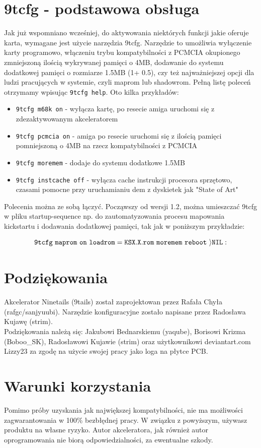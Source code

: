 \documentclass[10pt,a5paper]{article}
\begin{document}
\section *{9tcfg - podstawowa obsługa}

Jak już wspomniano wcześniej, do aktywowania niektórych funkcji jakie oferuje karta, wymagane jest użycie narzędzia 9tcfg. Narzędzie to umożliwia wyłączenie karty programowo, włączeniu trybu kompatybilności z PCMCIA okupionego zmniejszoną ilością wykrywanej pamięci o 4MB, dodawanie do systemu dodatkowej pamięci o rozmiarze 1.5MB (1+ 0.5),  czy też najważniejszej opcji dla ludzi pracujących w systemie, czyli maprom lub shadowrom. Pełną listę poleceń otrzymamy wpisując {\tt 9tcfg help}. Oto kilka przykładów:

\begin{itemize}
\item {\tt 9tcfg m68k on} - wyłącza kartę, po resecie amiga uruchomi się z zdezaktywowanym akceleratorem
\item {\tt 9tcfg pcmcia on} - amiga po resecie uruchomi się z ilością pamięci pomniejszoną o 4MB na rzecz kompatybilności z PCMCIA
\item {\tt 9tcfg moremem} - dodaje do systemu dodatkowe 1.5MB
\item {\tt 9tcfg instcache off} - wyłącza cache instrukcji procesora sprzętowo, czasami pomocne przy uruchamianiu dem z dyskietek jak "State of Art"
\end{itemize}

Polecenia można ze sobą łączyć. Począwszy od wersji 1.2, można umieszczać 9tcfg w pliku startup-sequence np. do zautomatyzowania procesu mapowania kickstartu i dodawania dodatkowej pamięci, tak jak w poniższym przykładzie:



{$$\tt 9tcfg \  maprom \  on \  loadrom=KSX.X.rom \  moremem \  reboot \  \rangle NIL:$$}


\section*{Podziękowania}

Akcelerator Ninetails (9tails) został zaprojektowan przez Rafała Chyła (rafgc/sanjyuubi). Narzędzie konfiguracyjne zostało napisane przez  Radosława Kujawę  (strim).\\

Podziękowania należą się: Jakubowi  Bednarskiemu (yaqube), Borisowi  Krizma (Boboo\_SK), Radosławowi Kujawie (strim) oraz użytkownikowi deviantart.com Lizzy23 za zgodę na użycie swojej pracy jako loga na płytce PCB.


\section*{Warunki korzystania}
Pomimo próby uzyskania jak największej kompatybilności, nie ma możliwości zagwarantowania w 100\% bezbłędnej pracy. W związku z powyższym, używasz produktu na własne ryzyko. Autor akceleratora, jak również autor oprogramowania nie biorą odpowiedzialności, za ewentualne szkody.
\end{document}
